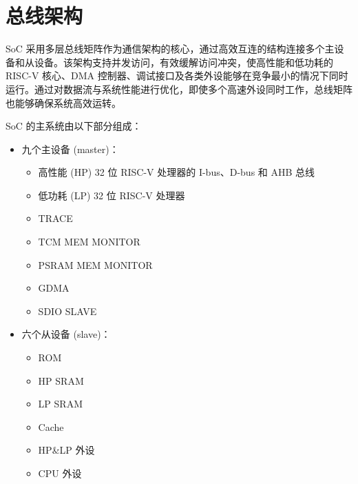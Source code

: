 \documentclass[main\_\_CN.tex]{subfiles}
\begin{document}

\ifglobal
\else
    \listoftodos
    {\let\clearpage\relax \listofdonetodos}
    \tableofcontents
\fi



\hypertarget{busarch}{}
\chapter{总线架构}
\label{mod:busarch}

\chipname{} SoC 采用多层总线矩阵作为通信架构的核心，通过高效互连的结构连接多个主设备和从设备。该架构支持并发访问，有效缓解访问冲突，使高性能和低功耗的 RISC-V 核心、DMA 控制器、调试接口及各类外设能够在竞争最小的情况下同时运行。通过对数据流与系统性能进行优化，即使多个高速外设同时工作，总线矩阵也能够确保系统高效运转。

\chipname{} SoC 的主系统由以下部分组成：

\begin{itemize}
    \item 九个主设备 (master)：
        \begin{itemize}
            \item 高性能 (HP) 32 位 RISC-V 处理器的 I-bus、D-bus 和 AHB 总线
            \item 低功耗 (LP) 32 位 RISC-V 处理器
            \item TRACE
            \item TCM MEM MONITOR
            \item PSRAM MEM MONITOR
            \item GDMA
            \item SDIO SLAVE
        \end{itemize}
    \item 六个从设备 (slave)：
        \begin{itemize}
            \item ROM
            \item HP SRAM
            \item LP SRAM
            \item Cache
            \item HP\&LP 外设
            \item CPU 外设
        \end{itemize}
\end{itemize}
\end{document}

